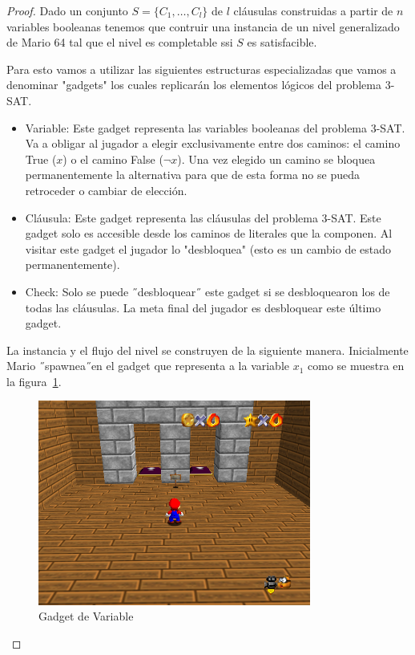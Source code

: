 \documentclass[runningheads]{llncs}
\begin{document}
\begin{proof}
Dado un conjunto $S= \{ C_1,\dots,C_l \}$ de $l$ cláusulas construidas a partir de $n$ variables booleanas tenemos
que contruir una instancia de un nivel generalizado de Mario 64 tal que el nivel es completable ssi $S$ es satisfacible. 

Para esto vamos a utilizar las siguientes estructuras especializadas que vamos a denominar "gadgets" los cuales replicarán los elementos
lógicos del problema 3-SAT.

\begin{itemize}
\item Variable: Este gadget representa las variables booleanas del problema 3-SAT. Va a obligar al jugador a elegir exclusivamente
entre dos caminos: el camino True ($x$) o el camino False ($\neg x$). Una vez elegido un camino se bloquea permanentemente la alternativa 
para que de esta forma no se pueda retroceder o cambiar de elección.
\item Cláusula: Este gadget representa las cláusulas del problema 3-SAT. Este gadget solo es accesible desde los caminos de literales
que la componen. Al visitar este gadget el jugador lo "desbloquea" (esto es un cambio de estado permanentemente).
\item Check: Solo se puede ˝desbloquear˝ este gadget si se desbloquearon los de todas las cláusulas. La meta final del jugador
es desbloquear este último gadget.
\end{itemize}

La instancia y el flujo del nivel se construyen de la siguiente manera. Inicialmente Mario ˝spawnea˝en el gadget que representa 
a la variable $x_1$ como se muestra en la figura~\ref{var-gadget}.

\begin{figure}[htbp]
    \centering
    \includegraphics[width=0.8\textwidth]{./Pictures/variable-gadget.png}
    \caption{Gadget de Variable}
    \label{var-gadget}
\end{figure}



\end{proof}
\end{document}
